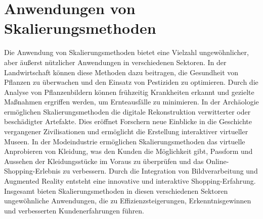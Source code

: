 \section{Anwendungen von Skalierungsmethoden}
    Die Anwendung von Skalierungsmethoden bietet eine Vielzahl ungewöhnlicher, aber äußerst nützlicher Anwendungen in verschiedenen Sektoren.
    In der Landwirtschaft können diese Methoden dazu beitragen, die Gesundheit von Pflanzen zu überwachen und den Einsatz von Pestiziden zu optimieren.
    Durch die Analyse von Pflanzenbildern können frühzeitig Krankheiten erkannt und gezielte Maßnahmen ergriffen werden, um Ernteausfälle zu minimieren.
    In der Archäologie ermöglichen Skalierungsmethoden die digitale Rekonstruktion verwitterter oder beschädigter Artefakte.
    Dies eröffnet Forschern neue Einblicke in die Geschichte vergangener Zivilisationen und ermöglicht die Erstellung interaktiver virtueller Museen.
    In der Modeindustrie ermöglichen Skalierungsmethoden das virtuelle Anprobieren von Kleidung, was den Kunden die Möglichkeit gibt, Passform und Aussehen der Kleidungsstücke im Voraus zu überprüfen und das Online-Shopping-Erlebnis zu verbessern.
    Durch die Integration von Bildverarbeitung und Augmented Reality entsteht eine innovative und interaktive Shopping-Erfahrung.
    Insgesamt bieten Skalierungsmethoden in diesen verschiedenen Sektoren ungewöhnliche Anwendungen, die zu Effizienzsteigerungen, Erkenntnisgewinnen und verbesserten Kundenerfahrungen führen.
